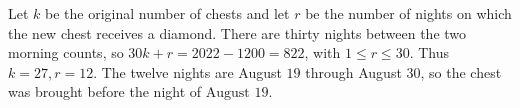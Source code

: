 Let $k$ be the original number of chests and let $r$ be the number of nights on which the new chest receives a diamond. There are thirty nights between the two morning counts, so $30k+r=2022-1200=822$, with $1\le r\le30$. Thus $k=27,r=12$. The twelve nights are August $19$ through August $30$, so the chest was brought before the night of $\boxed{\text{August }19}$.
